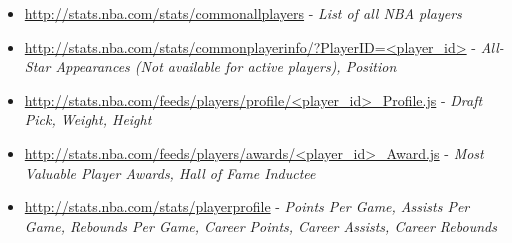 \documentclass[paper=a4, fontsize=11pt]{scrartcl} %
\numberwithin{equation}{section} %
\numberwithin{figure}{section} %
\numberwithin{table}{section} %
\begin{document}
\begin{itemize}
\item \url{http://stats.nba.com/stats/commonallplayers} - \textit{List of all NBA players}
\item \url{http://stats.nba.com/stats/commonplayerinfo/?PlayerID=<player_id>} - \textit{All-Star Appearances (Not available for active players), Position}
\item \url{http://stats.nba.com/feeds/players/profile/<player_id>_Profile.js} - \textit{Draft Pick, Weight, Height}
\item \url{http://stats.nba.com/feeds/players/awards/<player_id>_Award.js} - \textit{Most Valuable Player Awards, Hall of Fame Inductee}
\item \url{http://stats.nba.com/stats/playerprofile} - \textit{Points Per Game, Assists Per Game, Rebounds Per Game, Career Points, Career Assists, Career Rebounds}
\end{itemize}
\end{document}

